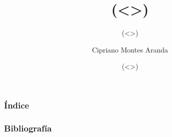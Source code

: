 \documentclass{beamer}
\begin{document}
\title{(<>)}
 
\subtitle{(<>)}
 
\author{Cipriano Montes Aranda}
 
\date{(<>)}
 

\frame{\titlepage}


\begin{frame}
\frametitle{Índice}
\tableofcontents
\end{frame}


\begin{frame}
	\frametitle{Bibliografía}
	\printbibliography
\end{frame}
\end{document}
